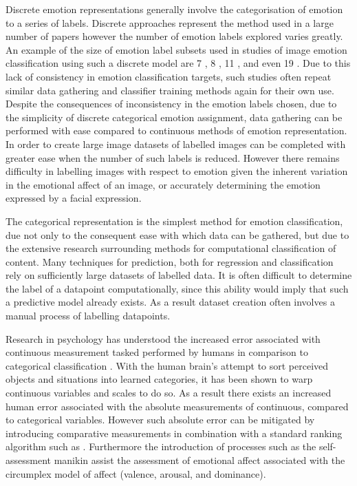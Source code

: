 \documentclass{article}
\begin{document}
Discrete emotion representations generally involve the categorisation of emotion to a series of labels.
Discrete approaches represent the method used in a large number of papers \citep{machajdik2010affective,ali2017emotional,wangarttalk,mohammad2018wikiart} however the number of emotion labels explored varies greatly.
An example of the size of emotion label subsets used in studies of image emotion classification using such a discrete model are 7 \citep{ali2017emotional}, 8 \citep{machajdik2010affective}, 11 \citep{wangarttalk}, and even 19 \citep{mohammad2018wikiart}.
Due to this lack of consistency in emotion classification targets, such studies often repeat similar data gathering and classifier training methods again for their own use.
Despite the consequences of inconsistency in the emotion labels chosen, due to the simplicity of discrete categorical emotion assignment, data gathering can be performed with ease compared to continuous methods of emotion representation.
In order to create large image datasets of labelled images can be completed with greater ease when the number of such labels is reduced.
However there remains difficulty in labelling images with respect to emotion given the inherent variation in the emotional affect of an image, or accurately determining the emotion expressed by a facial expression.

The categorical representation is the simplest method for emotion classification, due not only to the consequent ease with which data can be gathered, but due to the extensive research surrounding methods for computational classification of content.
Many techniques for prediction, both for regression and classification rely on sufficiently large datasets of labelled data.
It is often difficult to determine the label of a datapoint computationally, since this ability would imply that such a predictive model already exists.
As a result dataset creation often involves a manual process of labelling datapoints.

Research in psychology has understood the increased error associated with continuous measurement tasked performed by humans in comparison to categorical classification \citep{harnad2003categorical}.
With the human brain's attempt to sort perceived objects and situations into learned categories, it has been shown to warp continuous variables and scales to do so.
As a result there exists an increased human error associated with the absolute measurements of continuous, compared to categorical variables.
However such absolute error can be mitigated by introducing comparative measurements in combination with a standard ranking algorithm such as \citet{glickman2012example,glickman1995glicko}.
Furthermore the introduction of processes such as the self-assessment manikin \citep{lang1980behavioral} assist the assessment of emotional affect associated with the circumplex model of affect (valence, arousal, and dominance).
\end{document}

